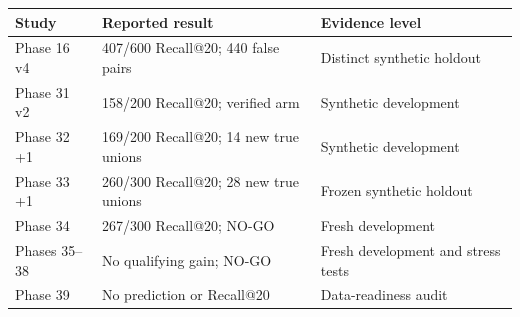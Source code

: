 \begin{tabularx}{0.94\textwidth}{p{2.8cm}X p{4.4cm}}
\toprule
Study & Reported result & Evidence level \\
\midrule
Phase 16 v4 & 407/600 Recall@20; 440 false pairs & Distinct synthetic holdout \\
Phase 31 v2 & 158/200 Recall@20; verified arm & Synthetic development \\
Phase 32 +1 & 169/200 Recall@20; 14 new true unions & Synthetic development \\
Phase 33 +1 & 260/300 Recall@20; 28 new true unions & Frozen synthetic holdout \\
Phase 34 & 267/300 Recall@20; NO-GO & Fresh development \\
Phases 35--38 & No qualifying gain; NO-GO & Fresh development and stress tests \\
Phase 39 & No prediction or Recall@20 & Data-readiness audit \\
\bottomrule
\end{tabularx}
